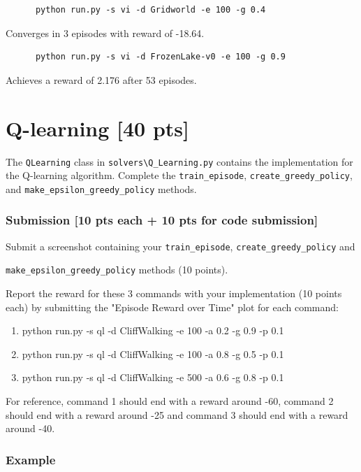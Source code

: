 \documentclass[a4paper]{article}
\theoremstyle{definition}
\begin{document}
\begin{verbatim}
      python run.py -s vi -d Gridworld -e 100 -g 0.4  
\end{verbatim}
Converges in 3 episodes with reward of -18.64.

\begin{verbatim}
      python run.py -s vi -d FrozenLake-v0 -e 100 -g 0.9  
\end{verbatim}
Achieves a reward of 2.176 after 53 episodes.

\section{Q-learning [40 pts]}

The \verb|QLearning| class in \verb|solvers\Q_Learning.py| contains the implementation for the Q-learning algorithm. Complete the \verb|train_episode|, \verb|create_greedy_policy|,  and \verb|make_epsilon_greedy_policy| methods.

\subsubsection*{Submission [10 pts each + 10 pts for code submission]}

Submit a screenshot containing your \verb|train_episode|, \verb|create_greedy_policy| and 

\verb|make_epsilon_greedy_policy| methods (10 points). 

Report the reward for these 3 commands with your implementation (10 points each) by submitting the "Episode Reward over Time" plot for each command:

\begin{enumerate}
    \item  python run.py -s ql -d CliffWalking -e 100 -a 0.2 -g 0.9 -p 0.1
    \item  python run.py -s ql -d CliffWalking -e 100 -a 0.8 -g 0.5 -p 0.1  
    \item  python run.py -s ql -d CliffWalking -e 500 -a 0.6 -g 0.8 -p 0.1   
\end{enumerate}

For reference, command 1 should end with a reward around -60, command 2 should end with a reward around -25 and command 3 should end with a reward around -40.

\subsubsection*{Example}
\end{document}

